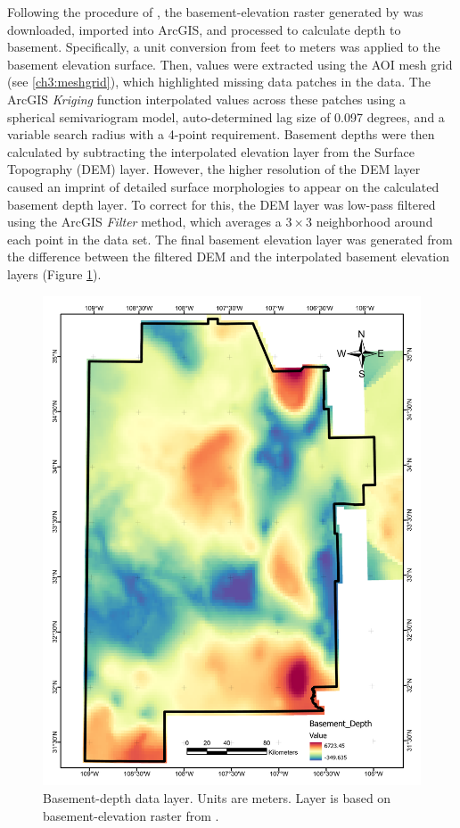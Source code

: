 Following the procedure of \citet{pepin_new_2019}, the basement-elevation raster generated by \citet{bielicki_hydrogeolgic_2015} was downloaded, imported into ArcGIS, and processed to calculate depth to basement. Specifically, a unit conversion from feet to meters was applied to the basement elevation surface. Then, values were extracted using the AOI mesh grid (see \ref{ch3:meshgrid}), which highlighted missing data patches in the data. The ArcGIS \textit{Kriging} function interpolated values across these patches using a spherical semivariogram model, auto-determined lag size of 0.097 degrees, and a variable search radius with a 4-point requirement. Basement depths were then calculated by subtracting the interpolated elevation layer from the Surface Topography (DEM) layer. However, the higher resolution of the DEM layer caused an imprint of detailed surface morphologies to appear on the calculated basement depth layer. To correct for this, the DEM layer was low-pass filtered using the ArcGIS \textit{Filter} method, which averages a $3\times3$ neighborhood around each point in the data set. The final basement elevation layer was generated from the difference between the filtered DEM and the interpolated basement elevation layers (Figure \ref{fig:feat_basementdepth}).

\begin{figure}[H]
\centering
\includegraphics[width=0.75\linewidth]{templates/images/Figure-BasementDepth.pdf}
\caption[Basement depth data layer]{Basement-depth data layer. Units are meters. Layer is based on basement-elevation raster from \protect\citet{bielicki_hydrogeolgic_2015}.}
\label{fig:feat_basementdepth}
\end{figure}

